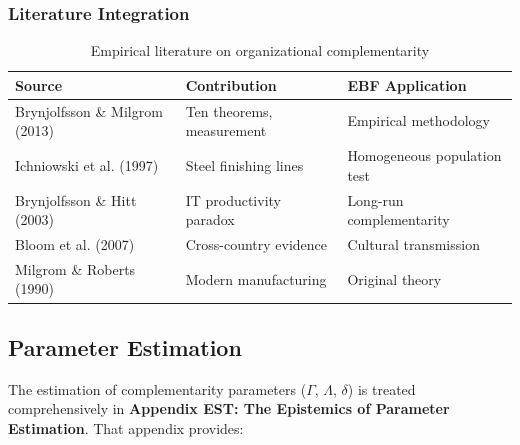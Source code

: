 \subsubsection{Literature Integration}

\begin{table}[h]
\centering
\small
\begin{tabular}{p{3.5cm}p{4cm}p{5cm}}
\toprule
\textbf{Source} & \textbf{Contribution} & \textbf{EBF Application} \\
\midrule
Brynjolfsson \& Milgrom (2013) & Ten theorems, measurement & Empirical methodology \\
Ichniowski et al. (1997) & Steel finishing lines & Homogeneous population test \\
Brynjolfsson \& Hitt (2003) & IT productivity paradox & Long-run complementarity \\
Bloom et al. (2007) & Cross-country evidence & Cultural transmission \\
Milgrom \& Roberts (1990) & Modern manufacturing & Original theory \\
\bottomrule
\end{tabular}
\caption{Empirical literature on organizational complementarity}
\label{tab:empirical-lit}
\end{table}







\subsection{Parameter Estimation}
\label{sec:B-estimation-ref}

The estimation of complementarity parameters ($\Gamma$, $\Lambda$, $\delta$) is 
treated comprehensively in \textbf{Appendix EST: The Epistemics of Parameter 
Estimation}. That appendix provides:

